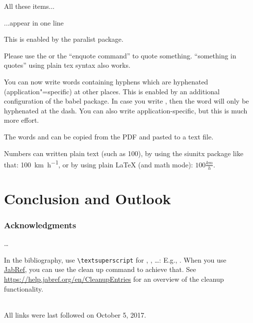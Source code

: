 \documentclass[english,runningheads,a4paper]{llncs}[2018/03/10]
\begin{document}
\begin{inparaenum}
  \item All these items...
  \item ...appear in one line
  \item This is enabled by the paralist package.
\end{inparaenum}

Please use the  or the \enquote{enquote command} to quote something.
``something in quotes'' using plain tex syntax also works.

You can now write words containing hyphens which are hyphenated (application"=specific) at other places.
This is enabled by an additional configuration of the babel package.
In case you write , then the word will only be hyphenated at the dash.
You can also write applica\allowbreak{}tion-specific, but this is much more effort.

The words  and  can be copied from the PDF and pasted to a text file.

Numbers can written plain text (such as 100), by using the siunitx package like that:
\SI{100}{\km\per\hour},
or by using plain \LaTeX{} (and math mode):
$100 \frac{\mathit{km}}{h}$.

\section{Conclusion and Outlook}
\label{sec:outlook}
\lipsum[1-2]

\subsubsection*{Acknowledgments}
\ldots

In the bibliography, use \texttt{\textbackslash textsuperscript} for , , \ldots:
E.g., .
When you use \href{https://www.jabref.org}{JabRef}, you can use the clean up command to achieve that.
See \url{https://help.jabref.org/en/CleanupEntries} for an overview of the cleanup functionality.

\renewcommand{\bibsection}{\section*{References}} %

\begingroup
  \ifluatex
  \else
  \fi
  \small %
  
\endgroup

\ \\
%
All links were last followed on October 5, 2017.
\end{document}
